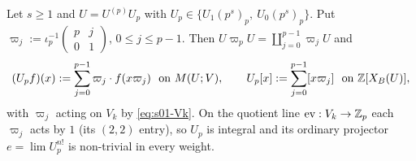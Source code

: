 \begin{definition}\label{def:s01-NUp}
Let $s\ge1$ and $U=U^{(p)}U_p$ with $U_p\in\{U_1(p^s)_p,\ U_0(p^s)_p\}$. Put $\varpi_j:=\iota_p^{-1}\left(\begin{smallmatrix}p&j\\0&1\end{smallmatrix}\right)$,
$0\le j\le p-1$. Then $U\varpi_pU=\coprod_{j=0}^{p-1}\varpi_jU$ and
\[(U_pf)(x):=\sum_{j=0}^{p-1}\varpi_j\cdot f(x\varpi_j)\ \ \text{on }M(U;V),\qquad U_p[x]:=\sum_{j=0}^{p-1}[x\varpi_j]\ \ \text{on }\mathbb{Z}[X_B(U)],\]
with $\varpi_j$ acting on $V_k$ by \eqref{eq:s01-Vk}. On the quotient line $\mathrm{ev}:V_k\to\mathbb{Z}_p$ each $\varpi_j$ acts by $1$
(its $(2,2)$ entry), so $U_p$ is integral and its ordinary projector $e=\lim U_p^{n!}$ is non-trivial in every weight.
\end{definition}

